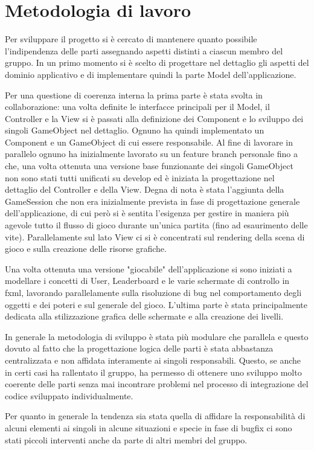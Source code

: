 \documentclass[a4paper,12pt]{report}
\begin{document}
\section{Metodologia di lavoro}
Per sviluppare il progetto si è cercato di mantenere quanto possibile l'indipendenza delle parti assegnando aspetti distinti a ciascun membro del gruppo.
In un primo momento si è scelto di progettare nel dettaglio gli aspetti del dominio applicativo e di implementare quindi la parte Model dell'applicazione. 

Per una questione di coerenza interna la prima parte è stata svolta in collaborazione: una volta definite le interfacce principali per il Model, il Controller e la View si è passati alla definizione dei Component e lo sviluppo dei singoli GameObject nel dettaglio.
Ognuno ha quindi implementato un Component e un GameObject di cui essere responsabile.
Al fine di lavorare in parallelo ognuno ha inizialmente lavorato su un feature branch personale fino a che, una volta ottenuta una versione base funzionante dei singoli GameObject non sono stati tutti unificati su develop ed è iniziata la progettazione nel dettaglio del Controller e della View.
Degna di nota è stata l'aggiunta della GameSession che non era inizialmente prevista in fase di progettazione generale dell'applicazione, di cui però si è sentita l'esigenza per gestire in maniera più agevole tutto il flusso di gioco durante un'unica partita (fino ad esaurimento delle vite).
Parallelamente sul lato View ci si è concentrati sul rendering della scena di gioco e sulla creazione delle risorse grafiche.

Una volta ottenuta una versione "giocabile" dell'applicazione si sono iniziati a modellare i concetti di User, Leaderboard e le varie schermate di controllo in fxml, lavorando parallelamente sulla risoluzione di bug nel comportamento degli oggetti e dei poteri e sul generale del gioco.
L'ultima parte è stata principalmente dedicata alla stilizzazione grafica delle schermate e alla creazione dei livelli.

In generale la metodologia di sviluppo è stata più modulare che parallela e questo dovuto al fatto che la progettazione logica delle parti è stata abbastanza centralizzata e non affidata interamente ai singoli responsabili.
Questo, se anche in certi casi ha rallentato il gruppo, ha permesso di ottenere uno sviluppo molto coerente delle parti senza mai incontrare problemi nel processo di integrazione del codice sviluppato individualmente.

Per quanto in generale la tendenza sia stata quella di affidare la responsabilità di alcuni elementi ai singoli in alcune situazioni e specie in fase di bugfix ci sono stati piccoli interventi anche da parte di altri membri del gruppo.
\end{document}
